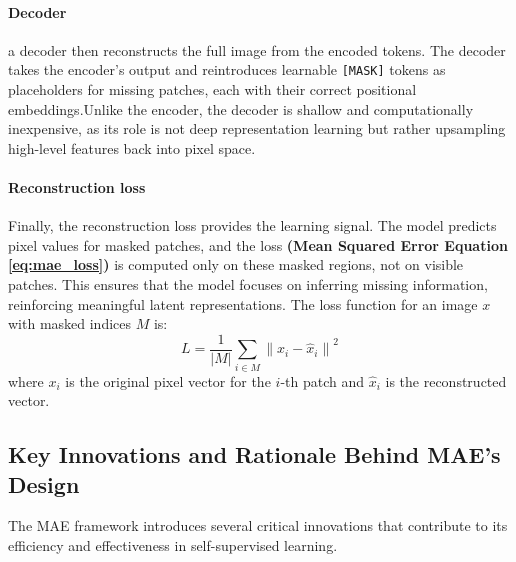\paragraph{Decoder} 
a decoder then reconstructs the full image from the encoded tokens.
The decoder takes the encoder's output and reintroduces learnable \texttt{[MASK]} tokens as placeholders for missing patches, each with their correct positional embeddings.Unlike the encoder, the decoder is shallow and computationally inexpensive, as its role is not deep representation learning but rather upsampling high-level features back into pixel space.

\paragraph{Reconstruction loss} Finally, the reconstruction loss provides the learning signal. The model predicts pixel values for masked patches, and the loss \textbf{(Mean Squared Error Equation \eqref{eq:mae_loss})} is computed only on these masked regions, not on visible patches. This ensures that the model focuses on inferring missing information, reinforcing meaningful latent representations. 
The loss function for an image $x$ with masked indices $M$ is:
\begin{equation}
    \label{eq:mae_loss}
    L = \frac{1}{|M|} \sum_{i \in M} \left\| x_i - \hat{x}_i \right\|^2
\end{equation}
where $x_i$ is the original pixel vector for the $i$-th patch and $\hat{x}_i$ is the reconstructed vector.

\subsection*{Key Innovations and Rationale Behind MAE’s Design}
The MAE framework introduces several critical innovations that contribute to its efficiency and effectiveness in self-supervised learning.

